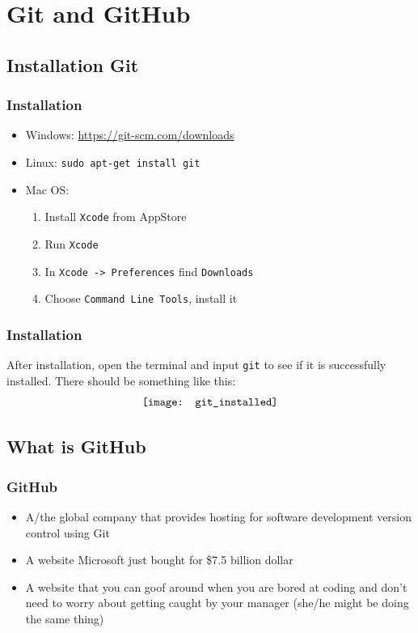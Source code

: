 \documentclass{beamer}
\begin{document}
	\section{Git and GitHub}
		\subsection{Installation Git}
			\begin{frame}
				\frametitle{Installation}
				\begin{itemize}
					\item Windows: \url{https://git-scm.com/downloads}
					\item Linux: \texttt{sudo apt-get install git}
					\item Mac OS: 
						\begin{enumerate}
							\item Install \texttt{Xcode} from AppStore 
							\item Run \texttt{Xcode} 
							\item In \texttt{Xcode -> Preferences} find \texttt{Downloads} 
							\item Choose \texttt{Command Line Tools}, install it
						\end{enumerate}					
				\end{itemize}
			\end{frame}

			\begin{frame}
				\frametitle{Installation}
				After installation, open the terminal and input \texttt{git} to see if it is successfully installed. There should be something like this:
				\begin{align}
					\centering
					\texttt{[image: git\_installed]} \nonumber
				\end{align}
			\end{frame}

		\subsection{What is GitHub}
			\begin{frame}
				\frametitle{GitHub}
				\begin{itemize}
					\item A/the global company that provides hosting for software development version control using Git
					\item A website Microsoft just bought for \$7.5 billion dollar
					\item A website that you can goof around when you are bored at coding and don't need to worry about getting caught by your manager (she/he might be doing the same thing)
				\end{itemize}
			\end{frame}
\end{document}
